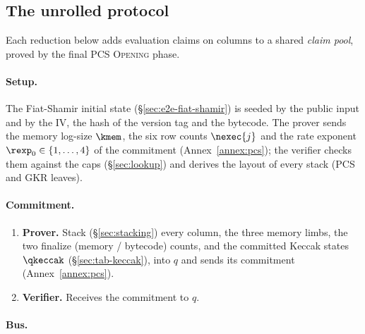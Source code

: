 \subsection{The unrolled protocol}\label{sec:e2e-unrolled}

Each reduction below adds evaluation claims on columns to a shared \emph{claim pool}, proved by the final PCS \textsc{Opening} phase.

\paragraph{Setup.}


The Fiat-Shamir initial state (\S\ref{sec:e2e-fiat-shamir}) is seeded by the public input and by the IV, the hash of the version tag and the bytecode. The prover sends the memory log-size $\kmem$, the six row counts $\nexec{j}$ and the rate exponent $\rexp_0\in\{1,\dots,4\}$ of the commitment (Annex~\ref{annex:pcs}); the verifier checks them against the caps (\S\ref{sec:lookup}) and derives the layout of every stack (PCS and GKR leaves).

\paragraph{Commitment.}

\begin{enumerate}
\item \textbf{Prover.} Stack (\S\ref{sec:stacking}) every column, the three memory limbs, the two finalize (memory / bytecode) counts, and the committed Keccak states $\qkeccak$ (\S\ref{sec:tab-keccak}), into $q$ and sends its commitment (Annex~\ref{annex:pcs}).
\item \textbf{Verifier.} Receives the commitment to $q$.
\end{enumerate}

\paragraph{Bus.}

